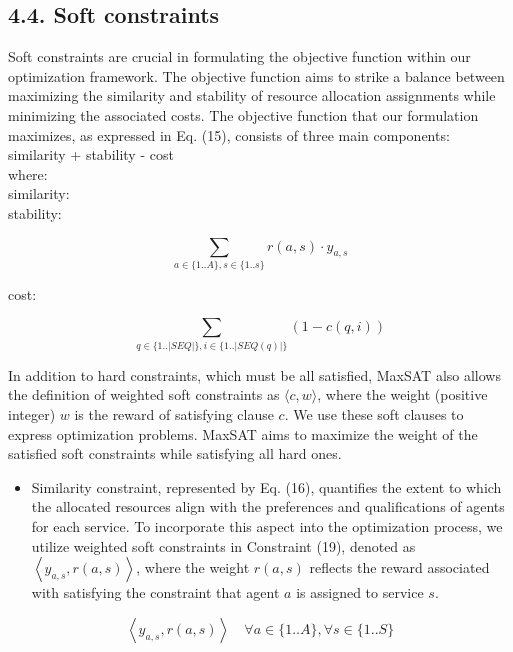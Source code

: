 \documentclass[10pt]{article}
\begin{document}
\subsection*{4.4. Soft constraints}
Soft constraints are crucial in formulating the objective function within our optimization framework. The objective function aims to strike a balance between maximizing the similarity and stability of resource allocation assignments while minimizing the associated costs. The objective function that our formulation maximizes, as expressed in Eq. (15), consists of three main components:\\
similarity + stability - cost\\
where:\\
similarity:\\
stability:


\begin{equation*}
\sum_{a \in\{1 . . A\}, s \in\{1 . . s\}} r(a, s) \cdot y_{a, s} \tag{16}
\end{equation*}


cost:


\begin{equation*}
\sum_{q \in\{1 . .|S E Q|\}, i \in\{1 . .|S E Q(q)|\}}(1-c(q, i)) \tag{17}
\end{equation*}


In addition to hard constraints, which must be all satisfied, MaxSAT also allows the definition of weighted soft constraints as $\langle c, w\rangle$, where the weight (positive integer) $w$ is the reward of satisfying clause $c$. We use these soft clauses to express optimization problems. MaxSAT aims to maximize the weight of the satisfied soft constraints while satisfying all hard ones.

\begin{itemize}
  \item Similarity constraint, represented by Eq. (16), quantifies the extent to which the allocated resources align with the preferences and qualifications of agents for each service. To incorporate this aspect into the optimization process, we utilize weighted soft constraints in Constraint (19), denoted as $\left\langle y_{a, s}, r(a, s)\right\rangle$, where the weight $r(a, s)$ reflects the reward associated with satisfying the constraint that agent $a$ is assigned to service $s$.
\end{itemize}


\begin{equation*}
\left\langle y_{a, s}, r(a, s)\right\rangle \quad \forall a \in\{1 . . A\}, \forall s \in\{1 . . S\} \tag{19}
\end{equation*}
\end{document}
